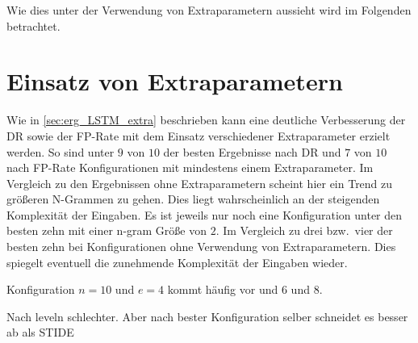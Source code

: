 Wie dies unter der Verwendung von Extraparametern aussieht wird im Folgenden betrachtet.

\section{Einsatz von Extraparametern}

Wie in \autoref{sec:erg_LSTM_extra} beschrieben kann eine deutliche Verbesserung der \ac{DR} sowie  der \ac{FP}-Rate mit dem Einsatz verschiedener Extraparameter erzielt werden.
So sind unter $9$ von $10$ der besten Ergebnisse nach \ac{DR} und $7$ von $10$ nach \ac{FP}-Rate Konfigurationen mit mindestens einem Extraparameter.
Im Vergleich zu den Ergebnissen ohne Extraparametern scheint hier ein Trend zu größeren N-Grammen zu gehen.
Dies liegt wahrscheinlich an der steigenden Komplexität der Eingaben.
Es ist jeweils nur noch eine Konfiguration unter den besten zehn mit einer n-gram Größe von $2$.
Im Vergleich zu drei bzw.\ vier der besten zehn bei Konfigurationen ohne Verwendung von Extraparametern.
Dies spiegelt eventuell die zunehmende Komplexität der Eingaben wieder.  

Konfiguration $n=10$ und $e=4$ kommt häufig vor und $6$ und $8$.

Nach leveln schlechter. 
Aber nach bester Konfiguration selber schneidet es besser ab als \ac{STIDE}
